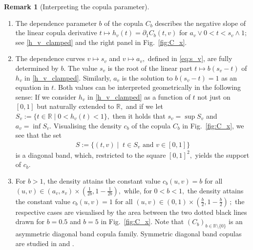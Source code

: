 \documentclass{article}
\theoremstyle{plain}
\theoremstyle{definition}
\newtheorem{remark}{Remark}
\begin{document}
\begin{remark}[Interpreting the copula parameter]
    \leavevmode
    \begin{enumerate}[label=(\alph*)]
    \item The dependence parameter \(b\) of the copula \(C_b\) describes the negative slope of the linear copula derivative \(t\mapsto h_v(t) = \partial_1 C_b(t,v)\) for \(a_v \vee 0 < t < s_v \wedge 1;\) see \eqref{h_v_clamped} and the right panel in Fig.~\ref{fig:C_x}. %
        \item The dependence curves \(v\mapsto s_v\) and \(v\mapsto a_v,\) defined in \eqref{eq:s_v}, are fully determined by \(b.\)
The value \(s_v\) is the root of the linear part \(t\mapsto b(s_v-t)\) of \(h_v\) in \eqref{h_v_clamped}.
Similarly, \(a_v\) is the solution to \(b(s_v-t) = 1\) as an equation in \(t.\)
Both values can be interpreted geometrically in the following sense:
If we consider \(h_v\) in \eqref{h_v_clamped} as a function of \(t\) not just on $[0,1]$ but naturally extended to \({\mathbb{R}},\) and if we let
\(
  S_v := \{t\in{\mathbb{R}} \mid 0 < h_v(t) < 1\} 
,\)
then it holds that $s_v = \sup S_v$ and $a_v = \inf S_v.$
Visualising the density $c_b$ of the copula \(C_b\) in Fig.~\ref{fig:C_x}, we see that the set
\begin{align}\label{eq:diag_band}
  S:=\{(t,v) \mid \; t\in S_v \text{ and } v\in[0,1]\}
\end{align}
is a diagonal band, which, restricted to the square $[0,1]^2,$ yields the support of $c_b.$
\item For \(b>1\), the density attains the constant value \(c_b(u,v) = b\) for all \((u,v)\in (a_v,s_v)\times (\tfrac 1 {2b}, 1-\tfrac 1 {2b}),\) while, for \(0  < b<1,\) the density attains the constant value \(c_b(u,v) = 1\) for all \((u,v)\in (0,1)\times (\tfrac b 2, 1-\tfrac b2)\,;\) the respective cases are visualised by the area between the two dotted black lines drawn for $b=0.5$ and $b=5$ in Fig.~\ref{fig:C_x}.
Note that \((C_b)_{b\in \mathbb{R}\setminus \{0\}}\) is an asymmetric diagonal band copula family.
Symmetric diagonal band copulas are studied in \cite{cooke1986monte} and \cite{Kotz-2010}.
\end{enumerate}
\end{remark}
\end{document}

